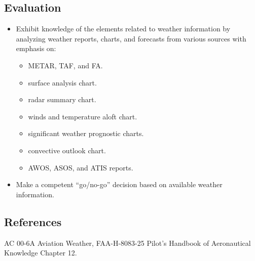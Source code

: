 \subsection{Evaluation}

\begin{itemize}
  \item Exhibit knowledge of the elements related to weather information by
    analyzing weather reports, charts, and forecasts from various sources with
    emphasis on:
    \begin{itemize}
      \item METAR, TAF, and FA.
      \item surface analysis chart.
      \item radar summary chart.
      \item winds and temperature aloft chart.
      \item significant weather prognostic charts.
      \item convective outlook chart.
      \item AWOS, ASOS, and ATIS reports.
    \end{itemize}
  \item Make a competent ``go/no-go'' decision based on available weather information.
\end{itemize}

\subsection{References}

AC 00-6A Aviation Weather, FAA-H-8083-25 Pilot's Handbook of Aeronautical
Knowledge Chapter 12.

